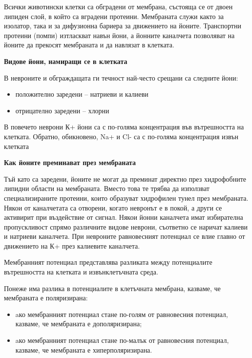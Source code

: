 \documentclass{article}
\begin{document}
Всички животински клетки са обградени от мембрана, състояща се от двоен липиден слой, в който са вградени протеини. Мембраната служи както за изолатор, така и за дифузионна бариера за движението на йоните. Транспортни протеини (помпи) изтласкват навън йони, а йонните каналчета позволяват на йоните да прекосят мембраната и да навлязат в клетката.

\vspace{5mm} %
\textbf{Видове йони, намиращи се в клетката}

В невроните и обграждащата ги течност най-често срещани са следните йони:
\begin{itemize}
  \item положително заредени -- натриеви и калиеви
  \item отрицателно заредени -- хлорни
\end{itemize}

В повечето неврони К+ йони са с по-голяма концентрация във вътрешността на клетката. Обратно, обикновено, Na+ и Cl- са с по-голяма концентрация извън клетката

\vspace{5mm}
\textbf{Как йоните преминават през мембраната}

Тъй като са заредени, йоните не могат да преминат директно през хидрофобните липидни области на мембраната. Вместо това те трябва да използват специализираните протеини, които образуват хидрофилен тунел през мембраната. Някои от каналчетата са отворени, когато невронът е в покой, а други се активирит при въздействие от сигнал. Някои йонни каналчета имат избирателна пропускливост спрямо различните видове неврони, съответно се наричат калиеви и натриеви каналчета. При невроните равновесният потенциал се влие главно от движението на К+ през калиевите каналчета.

\vspace{5mm} %

Мембранният потенциал представлява разликата между потенциалите вътрешността на клетката и извънклетъчната среда.

Понеже има разлика в потенциалите в клетъчната мембрана, казваме, че мембраната е поляризирана:
\begin{itemize}
  \item aко мембранният потенциал стане по-голям от равновесния потенциал, казваме, че мембраната е дополяризирана;
  \item aко мембранният потенциал стане по-малък от равновесния потенциал, казваме, че мембраната е хиперполяризирана.
\end{itemize}
\end{document}
